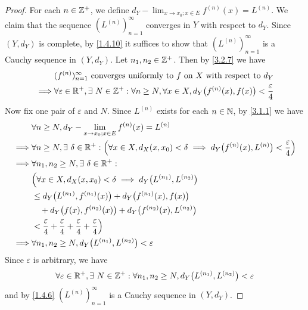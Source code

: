 \begin{proof}
  For each \(n \in \mathbb{Z}^+\), we define \(d_Y - \lim_{x \to x_0 ; x \in E} f^{(n)}(x) = L^{(n)}\).
  We claim that the sequence \((L^{(n)})_{n = 1}^\infty\) converges in \(Y\) with respect to \(d_Y\).
  Since \((Y, d_Y)\) is complete, by \cref{1.4.10} it suffices to show that \((L^{(n)})_{n = 1}^\infty\) is a Cauchy sequence in \((Y, d_Y)\).
  Let \(n_1, n_2 \in \mathbb{Z}^+\).
  Then by \cref{3.2.7} we have
  \begin{align*}
             & (f^{(n)})_{n = 1}^\infty \text{ converges uniformly to } f \text{ on } X \text{ with respect to } d_Y                                         \\
    \implies & \forall \varepsilon \in \mathbb{R}^+, \exists\ N \in \mathbb{Z}^+ : \forall n \geq N, \forall x \in X, d_Y\big(f^{(n)}(x), f(x)\big) < \dfrac{\varepsilon}{4}
  \end{align*}
  Now fix one pair of \(\varepsilon\) and \(N\).
  Since \(L^{(n)}\) exists for each \(n \in \mathbb{N}\), by \cref{3.1.1} we have
  \begin{align*}
             & \forall n \geq N, d_Y - \lim_{x \to x_0 ; x \in E} f^{(n)}(x) = L^{(n)}                                                                                         \\
    \implies & \forall n \geq N, \exists\ \delta \in \mathbb{R}^+ : \Big(\forall x \in X, d_X(x, x_0) < \delta \implies d_Y\big(f^{(n)}(x), L^{(n)}\big) < \dfrac{\varepsilon}{4}\Big) \\
    \implies & \forall n_1, n_2 \geq N, \exists\ \delta \in \mathbb{R}^+ :                                                                                                             \\
             & \Big(\forall x \in X, d_X(x, x_0) < \delta \implies d_Y\big(L^{(n_1)}, L^{(n_2)}\big)                                                                           \\
             & \leq d_Y\big(L^{(n_1)}, f^{(n_1)}(x)\big) + d_Y\big(f^{(n_1)}(x), f(x)\big)                                                                                     \\
             & \quad + d_Y\big(f(x), f^{(n_2)}(x)\big) + d_Y\big(f^{(n_2)}(x), L^{(n_2)}\big)                                                                                  \\
             & < \dfrac{\varepsilon}{4} + \dfrac{\varepsilon}{4} + \dfrac{\varepsilon}{4} + \dfrac{\varepsilon}{4}\Big)                                                        \\
    \implies & \forall n_1, n_2 \geq N, d_Y\big(L^{(n_1)}, L^{(n_2)}\big) < \varepsilon
  \end{align*}
  Since \(\varepsilon\) is arbitrary, we have
  \[
    \forall \varepsilon \in \mathbb{R}^+, \exists\ N \in \mathbb{Z}^+ : \forall n_1, n_2 \geq N, d_Y\big(L^{(n_1)}, L^{(n_2)}\big) < \varepsilon
  \]
  and by \cref{1.4.6} \((L^{(n)})_{n = 1}^\infty\) is a Cauchy sequence in \((Y, d_Y)\).


\end{proof}
